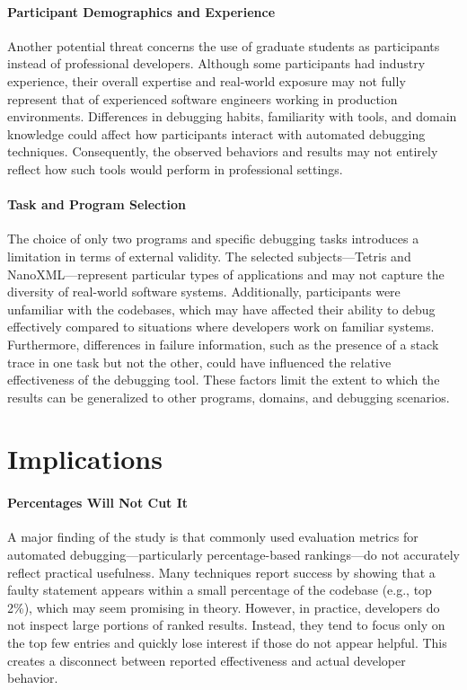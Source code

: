 \paragraph{Participant Demographics and Experience}
Another potential threat concerns the use of graduate students as participants instead of professional developers. Although some participants had industry experience, their overall expertise and real-world exposure may not fully represent that of experienced software engineers working in production environments. Differences in debugging habits, familiarity with tools, and domain knowledge could affect how participants interact with automated debugging techniques. Consequently, the observed behaviors and results may not entirely reflect how such tools would perform in professional settings.

\paragraph{Task and Program Selection}
The choice of only two programs and specific debugging tasks introduces a limitation in terms of external validity. The selected subjects—Tetris and NanoXML—represent particular types of applications and may not capture the diversity of real-world software systems. Additionally, participants were unfamiliar with the codebases, which may have affected their ability to debug effectively compared to situations where developers work on familiar systems. Furthermore, differences in failure information, such as the presence of a stack trace in one task but not the other, could have influenced the relative effectiveness of the debugging tool. These factors limit the extent to which the results can be generalized to other programs, domains, and debugging scenarios.


\section{Implications}

\paragraph{Percentages Will Not Cut It}
A major finding of the study is that commonly used evaluation metrics for automated debugging—particularly percentage-based rankings—do not accurately reflect practical usefulness. Many techniques report success by showing that a faulty statement appears within a small percentage of the codebase (e.g., top 2\%), which may seem promising in theory. However, in practice, developers do not inspect large portions of ranked results. Instead, they tend to focus only on the top few entries and quickly lose interest if those do not appear helpful. This creates a disconnect between reported effectiveness and actual developer behavior.


